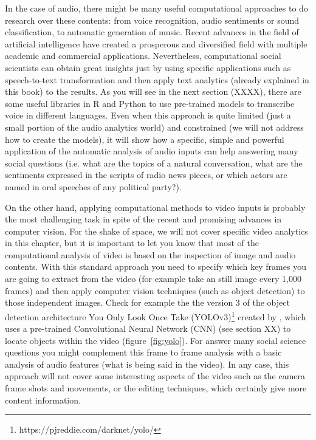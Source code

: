 In the case of audio, there might be many useful computational approaches to do research over these contents: from voice recognition, audio sentiments or sound classification, to automatic generation of music. Recent advances in the field of artificial intelligence have created a prosperous and diversified field with multiple academic and commercial applications. Nevertheless, computational social scientists can obtain great insights just by using specific applications such as speech-to-text transformation and then apply text analytics (already explained in this book) to the results. As you will see in the next section (XXXX), there are some useful libraries in R and Python to use pre-trained models to transcribe voice in different languages. Even when this approach is quite limited (just a small portion of the audio analytics world) and constrained (we will not address how to create the models), it will show how a specific, simple and powerful application of the automatic analysis of audio inputs can help answering many social questions (i.e. what are the topics of a natural conversation, what are the sentiments expressed in the scripts of radio news pieces, or which actors are named in oral speeches of any political party?).

On the other hand, applying computational methods to video inputs is probably the most challenging task in spite of the recent and promising advances in computer vision. For the shake of space, we will not cover specific video analytics in this chapter, but it is important to let you know that most of the computational analysis of video is based on the inspection of image and audio contents. With this standard approach you need to specify which key frames you are going to extract from the video (for example take an still image every 1,000 frames) and then apply computer vision techniques (such as object detection) to those independent images. Check for example the the version 3 of the object detection architecture You Only Look Once Take (YOLOv3)\footnote{https://pjreddie.com/darknet/yolo/} created by \citet{redmon2018yolov3}, which uses a pre-trained Convolutional Neural Network (CNN) (see section XX) to locate objects within the video (figure~\ref{fig:yolo}). For answer many social science questions you might complement this frame to frame analysis with a basic analysis of audio features (what is being said in the video). In any case, this approach will not cover some interesting aspects of the video such as the camera frame shots and movements, or the editing techniques, which certainly give more content information.

